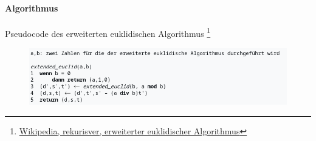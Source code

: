 \paragraph{Algorithmus} Pseudocode des erweiterten euklidischen Algorithmus
\footnote{\href{https://de.wikipedia.org/wiki/Erweiterter_euklidischer_Algorithmus\#Rekursive_Variante}{Wikipedia, rekurisver, erweiterter euklidischer Algorithmus}}
\begin{figure}[h]
    \centering
    \includegraphics[width=\textwidth]{img/extended_euclid.png}
    \label{ref:ext_euclid}
\end{figure}\newpage
